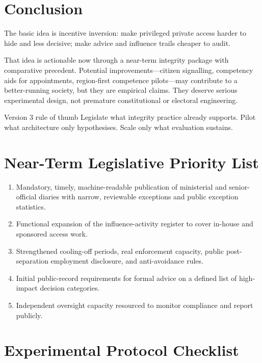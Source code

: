 \documentclass[11pt,a4paper]{article}
\begin{document}
\section{Conclusion}

The basic idea is incentive inversion: make privileged private access harder to hide and less decisive; make advice and influence trails cheaper to audit.

That idea is actionable now through a near-term integrity package with comparative precedent. Potential improvements---citizen signalling, competency aids for appointments, region-first competence pilots---may contribute to a better-running society, but they are empirical claims. They deserve serious experimental design, not premature constitutional or electoral engineering.

\begin{principlebox}{Version 3 rule of thumb}
Legislate what integrity practice already supports. Pilot what architecture only hypothesises. Scale only what evaluation sustains.
\end{principlebox}

\appendix

\section{Near-Term Legislative Priority List}

\begin{enumerate}[leftmargin=*]
    \item Mandatory, timely, machine-readable publication of ministerial and senior-official diaries with narrow, reviewable exceptions and public exception statistics.
    \item Functional expansion of the influence-activity register to cover in-house and sponsored access work.
    \item Strengthened cooling-off periods, real enforcement capacity, public post-separation employment disclosure, and anti-avoidance rules.
    \item Initial public-record requirements for formal advice on a defined list of high-impact decision categories.
    \item Independent oversight capacity resourced to monitor compliance and report publicly.
\end{enumerate}

\section{Experimental Protocol Checklist}
\end{document}
